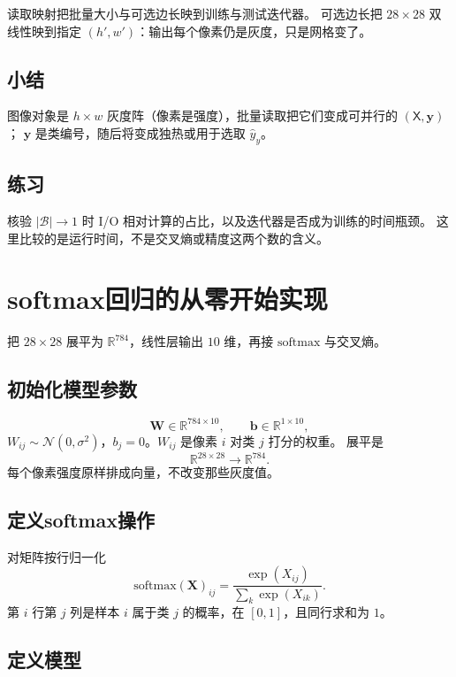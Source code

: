 读取映射把批量大小与可选边长映到训练与测试迭代器。
可选边长把 $28\times 28$ 双线性映到指定 $(h',w')$：输出每个像素仍是灰度，只是网格变了。

\subsection{小结}

图像对象是 $h\times w$ 灰度阵（像素是强度），批量读取把它们变成可并行的 $(\mathsf{X},\bm{y})$；
$\bm{y}$ 是类编号，随后将变成独热或用于选取 $\hat{y}_{y}$。

\subsection{练习}

核验 $|\mathcal{B}|\to 1$ 时 I/O 相对计算的占比，以及迭代器是否成为训练的时间瓶颈。
这里比较的是运行时间，不是交叉熵或精度这两个数的含义。

\section{softmax回归的从零开始实现}

把 $28\times 28$ 展平为 $\mathbb{R}^{784}$，线性层输出 $10$ 维，再接 $\mathrm{softmax}$ 与交叉熵。

\subsection{初始化模型参数}

\[
\bm{W}\in\mathbb{R}^{784\times 10},\qquad \bm{b}\in\mathbb{R}^{1\times 10},
\]
$W_{ij}\sim\mathcal{N}(0,\sigma^{2})$，$b_{j}=0$。$W_{ij}$ 是像素 $i$ 对类 $j$ 打分的权重。
展平是
\[
\mathbb{R}^{28\times 28}\longrightarrow\mathbb{R}^{784}.
\]
每个像素强度原样排成向量，不改变那些灰度值。

\subsection{定义softmax操作}

对矩阵按行归一化
\[
\mathrm{softmax}(\bm{X})_{ij}=\frac{\exp(X_{ij})}{\sum_{k}\exp(X_{ik})}.
\]
第 $i$ 行第 $j$ 列是样本 $i$ 属于类 $j$ 的概率，在 $[0,1]$，且同行求和为 $1$。

\subsection{定义模型}

